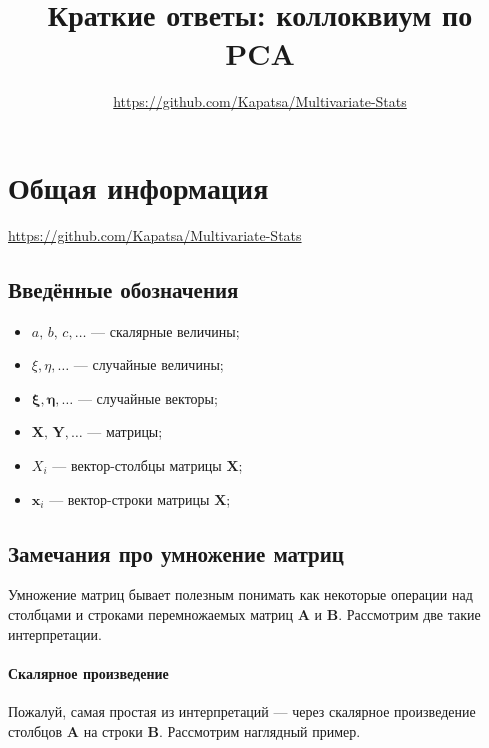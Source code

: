 \documentclass[12pt,a4paper,final]{article}
\author{\url{https://github.com/Kapatsa/Multivariate-Stats}}
\title{Краткие ответы: коллоквиум по PCA}
\begin{document}
\maketitle
\tableofcontents

\section{Общая информация}

\url{https://github.com/Kapatsa/Multivariate-Stats}

\subsection{Введённые обозначения}

\begin{itemize}
\item $a,\, b,\, c,\ldots$ --- скалярные величины;
\item $\xi, \eta, \ldots$ --- случайные величины;
\item $\bm \xi, \bm \eta, \ldots$ --- случайные векторы;
\item $\bm X,\, \bm Y, \ldots$ --- матрицы;
\item $X_i$ --- вектор-столбцы матрицы $\bm X$;
\item $\bm x_i$ --- вектор-строки матрицы $\bm X$;

\end{itemize}

\subsection{Замечания про умножение матриц}

Умножение матриц бывает полезным понимать как некоторые операции над столбцами и строками перемножаемых матриц $\bm A$ и $\bm B$. Рассмотрим две такие интерпретации.

\paragraph*{Скалярное произведение}
Пожалуй, самая простая из интерпретаций --- через скалярное произведение столбцов $\bm A$ на строки $\bm B$. Рассмотрим наглядный пример.
\end{document}
